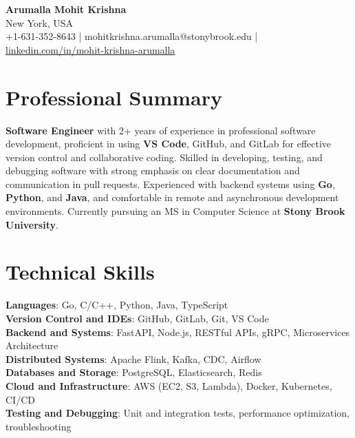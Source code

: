 \documentclass[letterpaper,11pt]{article}
\begin{document}
\begin{center}
  {\Large \textbf{Arumalla Mohit Krishna}} \\
  New York, USA \\
  +1-631-352-8643 \enspace | \enspace mohitkrishna.arumalla@stonybrook.edu \enspace | \enspace \href{https://www.linkedin.com/in/mohit-krishna-arumalla}{linkedin.com/in/mohit-krishna-arumalla}
\end{center}

\section{Professional Summary}
  \begin{itemize}[leftmargin=0.15in, label={}]
    \small{\item{
     \textbf{Software Engineer} with 2+ years of experience in professional software development, proficient in using \textbf{VS Code}, GitHub, and GitLab for effective version control and collaborative coding. Skilled in developing, testing, and debugging software with strong emphasis on clear documentation and communication in pull requests. Experienced with backend systems using \textbf{Go}, \textbf{Python}, and \textbf{Java}, and comfortable in remote and asynchronous development environments. Currently pursuing an MS in Computer Science at \textbf{Stony Brook University}.
    }}
  \end{itemize}
\vspace{-16pt}

\section{Technical Skills}
 \begin{itemize}[leftmargin=0.15in, label={}]
    \small{\item{
     \textbf{Languages}: Go, C/C++, Python, Java, TypeScript \\
     \textbf{Version Control and IDEs}: GitHub, GitLab, Git, VS Code \\
     \textbf{Backend and Systems}: FastAPI, Node.js, RESTful APIs, gRPC, Microservices Architecture \\
     \textbf{Distributed Systems}: Apache Flink, Kafka, CDC, Airflow \\
     \textbf{Databases and Storage}: PostgreSQL, Elasticsearch, Redis \\
     \textbf{Cloud and Infrastructure}: AWS (EC2, S3, Lambda), Docker, Kubernetes, CI/CD \\
     \textbf{Testing and Debugging}: Unit and integration tests, performance optimization, troubleshooting \\
    }}
 \end{itemize}
\vspace{-16pt}
\end{document}
